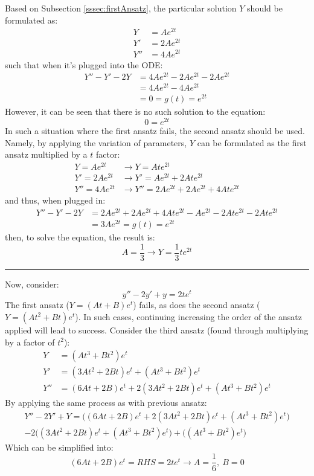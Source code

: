 \documentclass[12pt]{article}
\begin{document}
Based on Subsection \ref{sssec:firstAnsatz}, the particular solution $Y$ should be formulated as:
\begin{align*}
  Y   &= Ae^{2t} \\
  Y'  &= 2Ae^{2t} \\
  Y'' &= 4Ae^{2t}
\end{align*}
such that when it's plugged into the ODE:
\begin{align*}
  Y'' - Y' - 2Y &= 4Ae^{2t} - 2Ae^{2t} - 2Ae^{2t} \\
                &= 4Ae^{2t} - 4Ae^{2t} \\
                &= 0 = g(t) = e^{2t}
\end{align*}
However, it can be seen that there is no such solution to the equation:
\begin{equation*}
  0 = e^{2t}
\end{equation*}
In such a situation where the first ansatz fails, the second ansatz should be used. Namely, by applying the variation of parameters, $Y$ can be formulated as the first ansatz multiplied by a $t$ factor:
\begin{align*}
  Y   = Ae^{2t}    &\rightarrow Y   = Ate^{2t} \\
  Y'  = 2Ae^{2t}  &\rightarrow  Y'  = Ae^{2t} + 2Ate^{2t} \\
  Y'' = 4Ae^{2t} &\rightarrow   Y'' = 2Ae^{2t} + 2Ae^{2t} + 4Ate^{2t}
\end{align*}
and thus, when plugged in:
\begin{align*}
  Y'' - Y' - 2Y &= 2Ae^{2t} + 2Ae^{2t} + 4Ate^{2t} - Ae^{2t} - 2Ate^{2t} - 2Ate^{2t} \\
                &= 3Ae^{2t} = g(t) = e^{2t}
\end{align*}
then, to solve the equation, the result is:
\begin{equation*}
  A = \frac{1}{3} \rightarrow Y = \frac{1}{3}te^{2t}
\end{equation*}
\hrule

Now, consider:
\begin{equation*}
  y'' - 2y' + y = 2te^{t}
\end{equation*}
The first ansatz ($Y = (At+B)e^t$) fails, as does the second ansatz ($Y = (At^2 + Bt)e^t$). In such cases, continuing increasing the order of the ansatz applied will lead to success. Consider the third ansatz (found through multiplying by a factor of $t^2$):
\begin{align*}
  Y   &= (At^3 + Bt^2)e^t \\
  Y'  &= (3At^2 + 2Bt)e^t + (At^3 + Bt^2)e^t \\
  Y'' &= (6At+2B)e^t + 2(3At^2+2Bt)e^t + (At^3+Bt^2)e^t
\end{align*}
By applying the same process as with previous ansatz:
\begin{multline*}
  Y'' - 2Y' + Y = \big((6At+2B)e^t + 2(3At^2+2Bt)e^t + (At^3+Bt^2)e^t\big)\\ - 2\big((3At^2 + 2Bt)e^t + (At^3 + Bt^2)e^t\big) + \big((At^3 + Bt^2)e^t\big)
\end{multline*}
Which can be simplified into:
\begin{equation*}
  (6At+2B)e^t = RHS = 2te^t \rightarrow A = \frac{1}{6},\ B = 0
\end{equation*}
\end{document}
